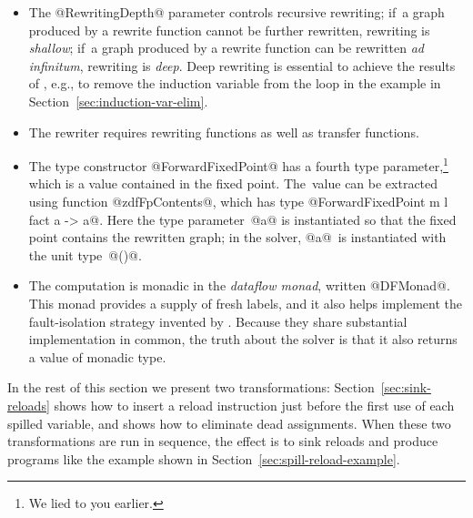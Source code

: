 \documentclass[blockstyle,preprint,nocopyrightspace]{sigplanconf}
\newcommand\secref[1]{Section~\ref{sec:#1}}
\newcommand\seclabel[1]{\label{sec:#1}}
\begin{document}
\begin{itemize}
\item
The @RewritingDepth@ parameter controls recursive rewriting;
if~a graph produced by a rewrite function cannot be further rewritten,
rewriting is \emph{shallow};
if~a graph produced by a rewrite function can be rewritten \emph{ad
infinitum}, rewriting is \emph{deep}.
Deep rewriting is essential to achieve the results of
\citet{lerner-grove-chambers:2002}, e.g., to remove the induction
variable from the loop in the example in \secref{induction-var-elim}.
\item
The rewriter requires rewriting functions as well as transfer
functions.
\item
The type constructor @ForwardFixedPoint@ has a fourth
type parameter,\footnote
{We lied to you earlier.}
which is a value contained in the fixed point.
The~value can be extracted using function @zdfFpContents@, which has
type @ForwardFixedPoint m l fact a -> a@.
Here the type parameter~@a@ is instantiated so that the fixed point
contains the rewritten graph;
in the solver, @a@~is instantiated with
the unit type~@()@.
\item
The computation is monadic in the \emph{dataflow monad}, written
@DFMonad@.
This monad provides a supply of fresh labels, and it
also helps implement the fault-isolation strategy invented by
\citet{whalley:isolation}.
Because they share substantial implementation in common, the truth
about the solver is that it also returns a value of monadic type.
\end{itemize}

In the rest of this section we present two transformations:
\secref{sink-reloads} shows how to insert a reload instruction just
before the first use of each spilled variable, and
\seclabel{dead-code-elim} shows how to eliminate dead assignments.
When these two transformations are run in sequence, the effect is to
sink reloads and produce programs like the example shown in
\secref{spill-reload-example}. 
\end{document}
